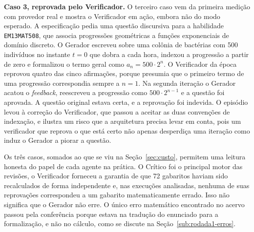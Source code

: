 \textbf{Caso 3, reprovada pelo Verificador.} O terceiro caso vem da primeira medição com provedor
real e mostra o Verificador em ação, embora não do modo esperado. A especificação pedia uma questão
discursiva para a habilidade \texttt{EM13MAT508}, que associa progressões geométricas a funções
exponenciais de domínio discreto. O Gerador escreveu sobre uma colônia de bactérias com 500
indivíduos no instante $t = 0$ que dobra a cada hora, indexou a progressão a partir de zero e
formalizou o termo geral como $a_n = 500 \cdot 2^n$. O Verificador da época reprovou quatro das
cinco afirmações, porque presumia que o primeiro termo de uma progressão correspondia sempre a
$n = 1$. Na segunda iteração o Gerador acatou o \emph{feedback}, reescreveu a progressão como
$500 \cdot 2^{n-1}$ e a questão foi aprovada. A questão original estava certa, e a reprovação foi
indevida. O episódio levou à correção do Verificador, que passou a aceitar as duas convenções de
indexação, e ilustra um risco que a arquitetura precisa levar em conta, pois um verificador que
reprova o que está certo não apenas desperdiça uma iteração como induz o Gerador a piorar a
questão.

Os três casos, somados ao que se viu na Seção~\ref{sec:custo}, permitem uma leitura honesta do
papel de cada agente na prática. O Crítico foi o principal motor das revisões, o Verificador
forneceu a garantia de que 72 gabaritos haviam sido recalculados de forma independente e, nas
execuções analisadas, nenhuma de suas reprovações correspondeu a um gabarito matematicamente
errado. Isso não significa que o Gerador não erre. O único erro matemático encontrado no acervo
passou pela conferência porque estava na tradução do enunciado para a formalização, e não no
cálculo, como se discute na Seção~\ref{sub:rodada1-erros}.
